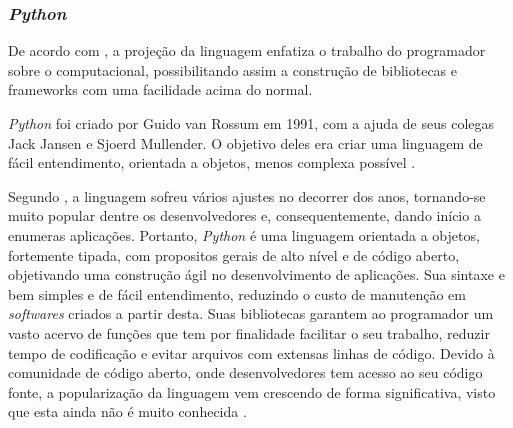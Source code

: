 \subsubsection{\textit{Python}}

De acordo com , a projeção da linguagem enfatiza o trabalho do programador sobre o computacional, possibilitando assim a construção de bibliotecas e frameworks com uma facilidade acima do normal.

\textit{Python} foi criado por Guido van Rossum em 1991, com a ajuda de seus colegas Jack Jansen e Sjoerd Mullender. O objetivo deles era criar uma linguagem de fácil entendimento, orientada a objetos, menos complexa possível \cite{SONGINI2005}.

Segundo , a linguagem sofreu vários ajustes no decorrer dos anos, tornando-se muito popular dentre os desenvolvedores e, consequentemente, dando início a enumeras aplicações. Portanto, \textit{Python} é uma linguagem orientada a objetos, fortemente tipada, com propositos gerais de alto nível e de código aberto, objetivando uma construção ágil no desenvolvimento de aplicações. Sua sintaxe e bem simples e de fácil entendimento, reduzindo o custo de manutenção em \textit{softwares} criados a partir desta. Suas bibliotecas garantem ao programador um vasto acervo de funções que tem por finalidade facilitar o seu trabalho, reduzir tempo de codificação e evitar arquivos com extensas linhas de código. Devido à comunidade de código aberto, onde desenvolvedores tem acesso ao seu código fonte, a popularização da linguagem vem crescendo de forma significativa, visto que esta ainda não é muito conhecida \cite{SONGINI2005}.